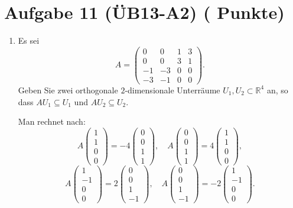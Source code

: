 \documentclass[11pt, a4paper]{article}
\newcommand{\aufgabe}[2]{%
  \section*{\Large\bfseries Aufgabe #1%
  \if\relax\detokenize{#2}\relax\else \hfill\normalfont\normalsize(#2 Punkte)\fi}%
  \vspace{-1.5ex}
}
\begin{document}
\aufgabe{11 (ÜB13-A2)}{}
\begin{enumerate}
  \item Es sei
  \[
    A=
    \begin{pmatrix}
      0 & 0 & 1 & 3\\
      0 & 0 & 3 & 1\\
     -1 & -3 & 0 & 0\\
     -3 & -1 & 0 & 0
    \end{pmatrix}.
  \]
  Geben Sie zwei orthogonale $2$-dimensionale Unterräume $U_1,U_2\subset \mathbb{R}^4$ an, so dass $AU_1\subseteq U_1$ und $AU_2\subseteq U_2$.
  \begin{framed}
  Man rechnet nach:
  \[
    A\!\begin{pmatrix}1\\1\\0\\0\end{pmatrix}=-4\!\begin{pmatrix}0\\0\\1\\1\end{pmatrix},\quad
    A\!\begin{pmatrix}0\\0\\1\\1\end{pmatrix}=4\!\begin{pmatrix}1\\1\\0\\0\end{pmatrix},
  \]
  \[
    A\!\begin{pmatrix}1\\-1\\0\\0\end{pmatrix}=2\!\begin{pmatrix}0\\0\\1\\-1\end{pmatrix},\quad
    A\!\begin{pmatrix}0\\0\\1\\-1\end{pmatrix}=-2\!\begin{pmatrix}1\\-1\\0\\0\end{pmatrix}.
\]
\end{framed}
\end{enumerate}
\end{document}
